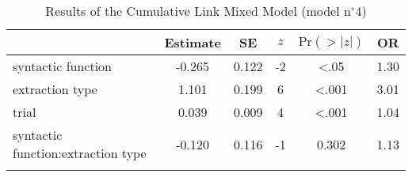 \begin{table}
\begin{tabularx}{\textwidth}{Q S[table-format=-1.3] S[table-format=1.3] S[table-format=-1] S[table-format=<1.3] S[table-format=1.2]}
  \lsptoprule
 & {Estimate} & {SE} & {$z$} & {$\text{Pr}(>|z|)$} & {OR} \\ 
  \midrule
  syntactic function & -0.265 & 0.122 & -2 & <.05 & 1.30 \\ 
  extraction type & 1.101 & 0.199 & 6 & <.001 & 3.01 \\ 
  trial & 0.039 & 0.009 & 4 & <.001 & 1.04 \\ 
  syntactic function:extraction type & -0.120 & 0.116 & -1 & 0.302 & 1.13 \\ 
   \lspbottomrule
\end{tabularx}
\caption{Results of the Cumulative Link Mixed Model (model n$^{\circ}$4)}
\label{tab:exp07-m4}
\end{table}
